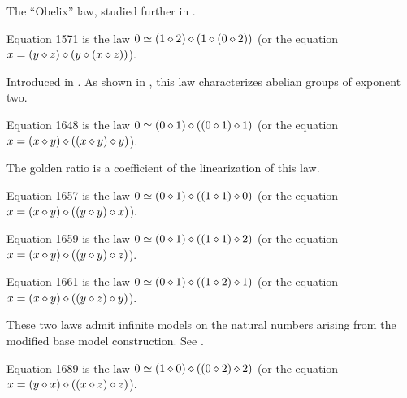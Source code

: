 The ``Obelix'' law, studied further in .

\begin{definition}[Equation 1571]\label{eq1571}\leanok{}  Equation 1571 is the law $0 \simeq  (1 \diamond 2) \diamond (1 \diamond (0 \diamond 2))$ (or the equation $x = (y \diamond z) \diamond (y \diamond (x \diamond z))$).
\end{definition}

Introduced in \cite{mendelsohn-padmanabhan}.  As shown in , this law characterizes abelian groups of exponent two.

\begin{definition}[Equation 1648]\label{eq1648}\leanok{}  Equation 1648 is the law $0 \simeq  (0 \diamond 1) \diamond ((0 \diamond 1) \diamond 1)$ (or the equation $x = (x \diamond y) \diamond ((x \diamond y) \diamond y)$).
\end{definition}

The golden ratio is a coefficient of the linearization of this law.

\begin{definition}[Equation 1657]\label{eq1657}\leanok{}  Equation 1657 is the law $0 \simeq  (0 \diamond 1) \diamond ((1 \diamond 1) \diamond 0)$ (or the equation $x = (x \diamond y) \diamond ((y \diamond y) \diamond x)$).
\end{definition}

\begin{definition}[Equation 1659]\label{eq1659}\leanok{}  Equation 1659 is the law $0 \simeq  (0 \diamond 1) \diamond ((1 \diamond 1) \diamond 2)$ (or the equation $x = (x \diamond y) \diamond ((y \diamond y) \diamond z)$).
\end{definition}

\begin{definition}[Equation 1661]\label{eq1661}\leanok{}  Equation 1661 is the law $0 \simeq  (0 \diamond 1) \diamond ((1 \diamond 2) \diamond 1)$ (or the equation $x = (x \diamond y) \diamond ((y \diamond z) \diamond y)$).
\end{definition}

These two laws admit infinite models on the natural numbers arising from the modified base model construction. See .

\begin{definition}[Equation 1689]\label{eq1689}\leanok{}  Equation 1689 is the law $0 \simeq  (1 \diamond 0) \diamond ((0 \diamond 2) \diamond 2)$ (or the equation $x = (y \diamond x) \diamond ((x \diamond z) \diamond z)$).
\end{definition}

